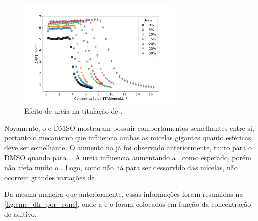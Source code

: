 			
			\begin{figure}[h]
				\centering
				\includegraphics[width=0.7\textwidth]{imagens/itc/ITC_ur}
				\caption{Efeito de ureia na titulação de \TTAB.}
				\label{fig:itc_ureia}
			\end{figure} 
		
		Novamente, o \BD{} e DMSO mostraram possuir comportamentos semelhantes entre si, portanto o mecanismo que influencia ambas as micelas gigantes quanto esféricas deve ser semelhante. O aumento na \cmc{} já foi observado anteriormente, tanto para o DMSO\cite{Bakshi1993a} quando para \BD.\cite{Abdel-Rahem2012}. A ureia influencia aumentando a \cmc{}, como esperado,\cite{Dias2002} porém não afeta muito o \DHmic{}. Logo, como não há \Sal{} para ser dessorvido das micelas, não ocorrem grandes variações de \DHmic.
		
		Da mesma maneira que anteriormente, essas informações foram resumidas na \autoref{fig:cmc_dh_por_conc}, onde a \cmc{} e o \DHmic{} foram colocados em função da concentração de aditivo.
		
%		

